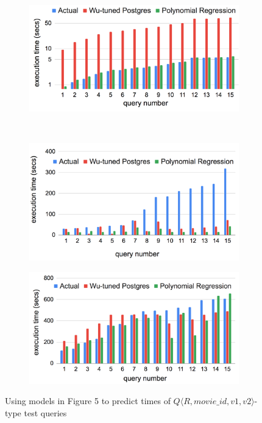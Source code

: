 \documentclass{article}
\begin{document}
\begin{figure}[h]
	\begin{subfigure}{.5\linewidth}
		\hspace{-2em}
		\includegraphics[scale=0.37]{./figs/exp/9/a.png}
		\label{fig:corr1}
	\end{subfigure}
	~
	\begin{subfigure}{.5\linewidth}
		\includegraphics[scale=0.37]{./figs/exp/9/b.png}
		\label{fig:corr1}
	\end{subfigure}
	\medskip
	\begin{subfigure}{\linewidth}
		\centering
		\includegraphics[scale=0.37]{./figs/exp/9/c.png}
		\label{fig:corrminus1}
	\end{subfigure}
	\caption{Using models in Figure 5 to predict times of $Q \langle R,movie\_id,v1,v2 \rangle $-type test queries}
	\label{fig:range}
\end{figure}
\end{document}

